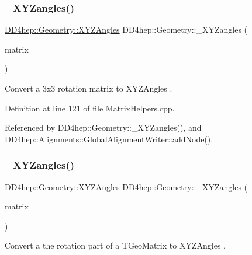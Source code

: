 \subsubsection{\texorpdfstring{\+\_\+\+X\+Y\+Zangles()}{\_XYZangles()}\hspace{0.1cm}{\footnotesize\ttfamily [1/2]}}
{\footnotesize\ttfamily \hyperlink{namespace_d_d4hep_1_1_geometry_ab195c63789d4928d291d3b5522151aaa}{D\+D4hep\+::\+Geometry\+::\+X\+Y\+Z\+Angles} D\+D4hep\+::\+Geometry\+::\+\_\+\+X\+Y\+Zangles (\begin{DoxyParamCaption}\item[{const double $\ast$}]{matrix }\end{DoxyParamCaption})}



Convert a 3x3 rotation matrix to X\+Y\+Z\+Angles . 



Definition at line 121 of file Matrix\+Helpers.\+cpp.



Referenced by D\+D4hep\+::\+Geometry\+::\+\_\+\+X\+Y\+Zangles(), and D\+D4hep\+::\+Alignments\+::\+Global\+Alignment\+Writer\+::add\+Node().

\hypertarget{group___d_d4_h_e_p___g_e_o_m_e_t_r_y_gaf4d63a5a06b85c2a65143cc5f15a81fe}{}\label{group___d_d4_h_e_p___g_e_o_m_e_t_r_y_gaf4d63a5a06b85c2a65143cc5f15a81fe} 
\subsubsection{\texorpdfstring{\+\_\+\+X\+Y\+Zangles()}{\_XYZangles()}\hspace{0.1cm}{\footnotesize\ttfamily [2/2]}}
{\footnotesize\ttfamily \hyperlink{namespace_d_d4hep_1_1_geometry_ab195c63789d4928d291d3b5522151aaa}{D\+D4hep\+::\+Geometry\+::\+X\+Y\+Z\+Angles} D\+D4hep\+::\+Geometry\+::\+\_\+\+X\+Y\+Zangles (\begin{DoxyParamCaption}\item[{const T\+Geo\+Matrix $\ast$}]{matrix }\end{DoxyParamCaption})}



Convert a the rotation part of a T\+Geo\+Matrix to X\+Y\+Z\+Angles . 



